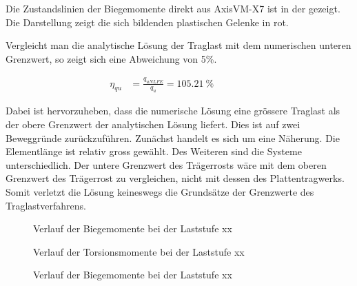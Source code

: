 \documentclass[
  11pt,
  letterpaper,
]{scrreprt}
\makeatletter
\newcommand*\pandocbounded[1]{%
  \sbox\pandoc@box{#1}%
  \Gscale@div\@tempa{\textheight}{\dimexpr\ht\pandoc@box+\dp\pandoc@box\relax}%
  \Gscale@div\@tempb{\linewidth}{\wd\pandoc@box}%
  \ifdim\@tempb\p@<\@tempa\p@\let\@tempa\@tempb\fi%
  \ifdim\@tempa\p@<\p@\scalebox{\@tempa}{\usebox\pandoc@box}%
  \else\usebox{\pandoc@box}%
  \fi%
}
\makeatother
\begin{document}
Die Zustandslinien der Biegemomente direkt aus AxisVM-X7 ist in der
gezeigt. Die Darstellung zeigt die sich bildenden plastischen Gelenke in
rot.

Vergleicht man die analytische Lösung der Traglast mit dem numerischen
unteren Grenzwert, so zeigt sich eine Abweichung von 5\%.

\[
\begin{aligned}
\eta_{q u}& = \frac{q_{u NLFE}}{q_{u}} = 105.21 \ \mathrm{\%} \quad &  \quad &  
 \end{aligned}
\]

Dabei ist hervorzuheben, dass die numerische Lösung eine grössere
Traglast als der obere Grenzwert der analytischen Lösung liefert. Dies
ist auf zwei Beweggründe zurückzuführen. Zunächst handelt es sich um
eine Näherung. Die Elementlänge ist relativ gross gewählt. Des Weiteren
sind die Systeme unterschiedlich. Der untere Grenzwert des Trägerrosts
wäre mit dem oberen Grenzwert des Trägerrost zu vergleichen, nicht mit
dessen des Plattentragwerks. Somit verletzt die Lösung keineswegs die
Grundsätze der Grenzwerte des Traglastverfahrens.

\begin{figure}[H]

\centering{

\pandocbounded{}

}

\caption{\label{fig-quad_1}Verlauf der Biegemomente bei der Laststufe
xx}

\end{figure}%

\begin{figure}[H]

\centering{

\pandocbounded{}

}

\caption{\label{fig-quad_4}Verlauf der Torsionsmomente bei der Laststufe
xx}

\end{figure}%

\begin{figure}[H]

\centering{

\pandocbounded{}

}

\caption{\label{fig-quad_2}Verlauf der Biegemomente bei der Laststufe
xx}

\end{figure}%
\end{document}
